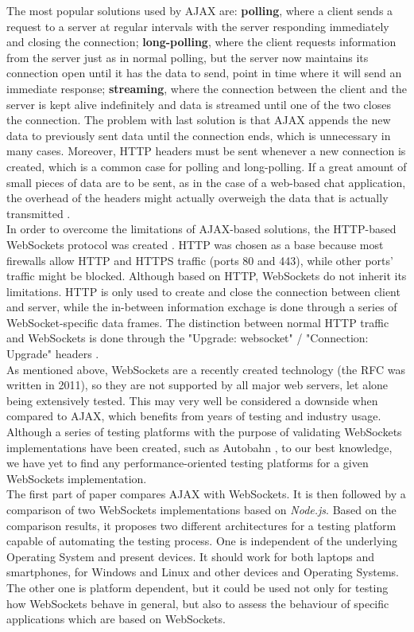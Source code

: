 \documentclass[conference]{IEEEtran}
\begin{document}
The most popular solutions used by AJAX are: \textbf{polling}, where a client sends
a request to a server at regular intervals with the server responding immediately
and closing the connection; \textbf{long-polling}, where the client requests
information from the server just as in normal polling, but the server now maintains
its connection open until it has the data to send, point in time where
it will send an immediate response;
\textbf{streaming}, where the connection between the client and the server is
kept alive indefinitely and data is streamed until one of the two closes the
connection. The problem with last solution is that AJAX
appends the new data to previously sent data until the connection ends, which is
unnecessary in many cases. Moreover, HTTP headers must be sent whenever a new
connection is created, which is a common case for polling and long-polling. If
a great amount of small pieces of data are to be sent, as in the case of a
web-based chat application, the overhead of the headers might actually overweigh
the data that is actually transmitted \cite{2009:Misc}.
\\

In order to overcome the limitations of AJAX-based solutions, the HTTP-based
WebSockets protocol was created \cite{RFC}. HTTP was chosen as a base because
most firewalls allow HTTP and HTTPS traffic  (ports 80 and 443), while other
ports' traffic might be blocked. Although based on HTTP, WebSockets do not
inherit its limitations. HTTP is only used to create and close the connection
between client and server, while the in-between information exchage is done
through a series of WebSocket-specific data frames. The distinction between
normal HTTP traffic and WebSockets is done through the "Upgrade: websocket" /
"Connection: Upgrade" headers \cite{RFC}.
\\

As mentioned above, WebSockets are a recently created technology  (the RFC was
written in 2011), so they are not supported by all major web servers, let alone
being extensively tested. This may very well be considered a downside when
compared to AJAX, which benefits from years of testing and industry usage.
Although a series of testing platforms with the purpose of validating WebSockets
implementations have been created, such as Autobahn \cite{Autobahn}, to our best
knowledge, we have yet to find any performance-oriented testing platforms for a
given WebSockets implementation.
\\

The first part of paper compares AJAX with WebSockets. It is then followed by
a comparison of two WebSockets implementations based on \textit{Node.js}.
Based on the comparison results, it proposes two different architectures for
a testing platform capable of automating the testing process.
One is independent
of the underlying Operating System and present devices. It should work for
both laptops and smartphones, for Windows and Linux and other devices and
Operating Systems. The other one is platform dependent, but it could be used
not only for testing how WebSockets behave in general, but also to assess
the behaviour of specific applications which are based on WebSockets.
\end{document}
